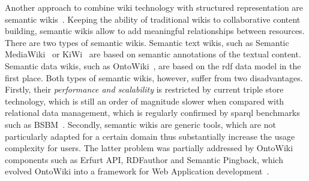 \documentclass[PhD, Submit, ngerman,UKenglish,table]{scrbook}
\makeatletter
\newcommand{\todo}[1]{\textcolor{red}{@TODO: #1}}
\makeatother
\begin{document}
Another approach to combine wiki technology with structured representation are semantic wikis~\cite{DBLP:journals/software/SchaffertBBK08}.
Keeping the ability of traditional wikis to collaborative content building, semantic wikis allow to add meaningful relationships between resources.
There are two types of semantic wikis.
Semantic text wikis, such as Semantic MediaWiki~\cite{smw:jws07} or KiWi~\cite{DBLP:conf/semwiki/SchaffertEGKRSS09} are based on semantic annotations of the textual content.
Semantic data wikis, such as OntoWiki~\cite{heino-n-2009-61-a}, are based on the \gls{rdf} data model in the first place.
Both types of semantic wikis, however, suffer from two disadvantages.
Firstly, their \textit{performance and scalability} is restricted by current triple store technology, which is still an order of magnitude slower when compared with relational data management, which is regularly confirmed by \gls{sparql} benchmarks such as BSBM~\cite{DBLP:journals/ijswis/BizerS09}.
Secondly, semantic wikis are generic tools, which are not particularly adapted for a certain domain thus substantially increase the usage complexity for users.
The latter problem was partially addressed by OntoWiki components such as Erfurt API, RDFauthor and Semantic Pingback, which evolved OntoWiki into a framework for Web Application development~\cite{heino-n-2009-61-a}.

\end{document}

